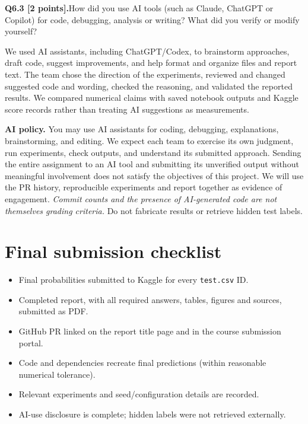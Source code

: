 \documentclass[11pt,letterpaper]{article}
\newcommand{\question}[2]{\needspace{4\baselineskip}\par\addvspace{0.45em}\noindent\textbf{#1}\quad #2\par\nobreak\vspace{0.1em}}
\begin{document}
\question{Q6.3 [2 points].}{How did you use AI tools (such as Claude, ChatGPT or Copilot) for code, debugging, analysis or writing? What did you verify or modify yourself?}
We used AI assistants, including ChatGPT/Codex, to brainstorm approaches, draft code, suggest improvements, and help format and organize files and report text. The team chose the direction of the experiments, reviewed and changed suggested code and wording, checked the reasoning, and validated the reported results. We compared numerical claims with saved notebook outputs and Kaggle score records rather than treating AI suggestions as measurements.

\textbf{AI policy.} You may use AI assistants for coding, debugging, explanations, brainstorming, and editing. We expect each team to exercise its own judgment, run experiments, check outputs, and understand its submitted approach. Sending the entire assignment to an AI tool and submitting its unverified output without meaningful involvement does not satisfy the objectives of this project. We will use the PR history, reproducible experiments and report together as evidence of engagement. \emph{Commit counts and the presence of AI-generated code are not themselves grading criteria.} Do not fabricate results or retrieve hidden test labels.


\section*{Final submission checklist}
\begin{itemize}[label=$\square$]
\item Final probabilities submitted to Kaggle for every \texttt{test.csv} ID.
\item Completed report, with all required answers, tables, figures and sources, submitted as PDF.
\item GitHub PR linked on the report title page and in the course submission portal.
\item Code and dependencies recreate final predictions (within reasonable numerical tolerance).
\item Relevant experiments and seed/configuration details are recorded.
\item AI-use disclosure is complete; hidden labels were not retrieved externally.
\end{itemize}
\end{document}
